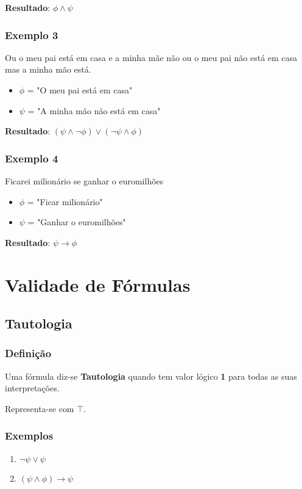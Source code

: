 \textbf{Resultado}: $\phi \land \psi$

\subsubsection{Exemplo 3}

Ou o meu pai está em casa e a minha mãe não ou o meu pai não está em casa mas a minha mão está.

\begin{itemize}
    \item $\phi$ = "O meu pai está em casa"
    \item $\psi$ = "A minha mão não está em casa"
\end{itemize}

\textbf{Resultado}: $(\psi \land \neg \phi) \lor (\neg \psi \land \phi)$

\subsubsection{Exemplo 4}

Ficarei milionário se ganhar o euromilhões

\begin{itemize}
    \item $\phi$ = "Ficar milionário"
    \item $\psi$ = "Ganhar o euromilhões"
\end{itemize}

\textbf{Resultado}: $\psi \rightarrow \phi$

\section{Validade de Fórmulas}

\subsection{Tautologia}
\subsubsection{Definição}
Uma fórmula diz-se \textbf{Tautologia} quando tem valor lógico \textbf{1} para todas as suas interpretações.

Representa-se com $\top$.

\subsubsection{Exemplos}
\begin{enumerate}
    \item $\neg \psi \lor \psi$
    \item $(\psi \land \phi) \rightarrow \psi$
\end{enumerate}

